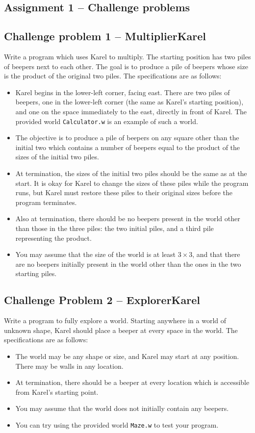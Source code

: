 \documentclass[11pt]{article}
\theoremstyle{plain}
\theoremstyle{definition}
\theoremstyle{remark}
\begin{document}
\begin{center}
\section*{Assignment 1 -- Challenge problems}
\end{center}
\subsection*{Challenge problem 1 -- MultiplierKarel}
Write a program which uses Karel to multiply. The starting position has two
piles of beepers next to each other. The goal is to produce a pile of beepers
whose size is the product of the original two piles. The specifications are as
follows:
\begin{itemize}
  \item Karel begins in the lower-left corner, facing east. There are two piles
    of beepers, one in the lower-left corner (the same as Karel's starting
    position), and one on the space immediately to the east, directly in front
    of Karel. The provided world {\tt Calculator.w} is an example of such a
    world.
  \item The objective is to produce a pile of beepers on any square other than
    the initial two which contains a number of beepers equal to the product of
    the sizes of the initial two piles.
  \item At termination, the sizes of the initial two piles should be the same as
    at the start. It is okay for Karel to change the sizes of these piles while
    the program runs, but Karel must restore these piles to their original sizes
    before the program terminates.
  \item Also at termination, there should be no beepers present in the world
    other than those in the three piles: the two initial piles, and a third pile
    representing the product.
  \item You may assume that the size of the world is at least $3\times 3$, and
    that there are no beepers initially present in the world other than the ones
    in the two starting piles.
\end{itemize}
\subsection*{Challenge Problem 2 -- ExplorerKarel}
Write a program to fully explore a world. Starting anywhere in a world of
unknown shape, Karel should place a beeper at every space in the world. The
specifications are as follows:
\begin{itemize}
  \item The world may be any shape or size, and Karel may start at any
    position. There may be walls in any location.
  \item At termination, there should be a beeper at every location which is
    accessible from Karel's starting point.
  \item You may assume that the world does not initially contain any beepers.
  \item You can try using the provided world {\tt Maze.w} to test your program.
\end{itemize}
\end{document}
